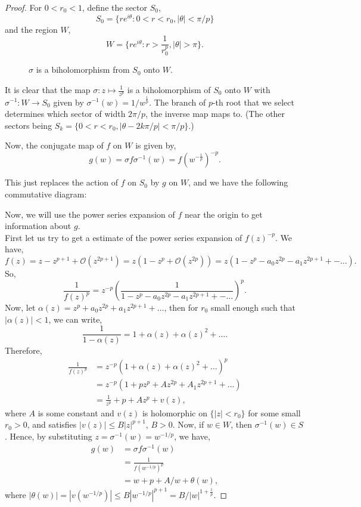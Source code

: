 \begin{proof}
	For \( 0<r_0<1 \), define the sector \( S_0 \), \[
		S_0=\{re^{i\theta}:0<r<r_0,|\theta |<\pi /p \}
	\] and the region \( W \), \[
	W=\{re^{i\theta }:r>\frac{1}{r_0^p},|\theta |>\pi\}
	.\] 

\begin{figure}[ht]
    \centering
    \caption{$\sigma$ is a biholomorphism from $S_0$ onto $W$.}
    \label{sigmamap}
\end{figure}

	It is clear that the map \( \sigma:z\mapsto \frac{1}{z^p} \) is a biholomorphism
	of \( S_0 \) onto \( W \) with \( \sigma^{-1}:W\to S_0 \) given by \( \sigma^{-1}(w)=1 /w^{\frac{1}{p}} \).
	The branch of \( p \)-th root that we select determines which sector of width \( 2\pi /p \), the inverse map
	maps to. (The other sectors being \( S_k=\{0<r<r_0,|\theta -2k\pi /p|<\pi /p \} \).)

	Now, the conjugate map of \( f \) on \( W \) is given by,\[
		g(w)=\sigma f \sigma ^{-1}(w)=f(w^{-\frac{1}{p}})^{-p}
	.\]

	This just replaces the action of \( f \) on \( S_0 \) by \( g \) on \( W \),
	and we have the following commutative diagram:

	Now, we will use the power series expansion of \( f \) near the origin to
	get information about \( g \).\\
	First let us try to get a estimate of the power series expansion of \( f(z)^{-p} \).
	We have, \[
		f(z)=z-z^{p+1}+\mathcal{O}(z^{2p+1})=z(1-z^p+\mathcal{O}(z^{2p}))=z(1-z^p-a_0z^{2p}-a_1z^{2p+1}+-\ldots)
	.\] 
	So, \[
		\frac{1}{f(z)^p}=z^{-p}\left(\frac{1}{1-z^p-a_0z^{2p}-a_1z^{2p+1}+-\ldots}\right)^p
	.\]  
	Now, let \( \alpha(z)=z^p+a_0z^{2p}+a_1z^{2p+1}+\ldots \), 
	then for \( r_0 \) small enough
	such that \( |\alpha(z)|<1 \), we can write, \[
		\frac{1}{1-\alpha(z)}=1+\alpha(z)+\alpha(z)^2+\ldots 
	.\] 
	Therefore,
	\begin{align*}
		\frac{1}{f(z)^p}&=z^{-p}(1+\alpha(z)+\alpha(z)^2+\ldots )^p\\
						&=z^{-p}(1+pz^p+Az^{2p}+A_1z^{2p+1}+\ldots )\\
						&=\frac{1}{z^p}+p+Az^p+v(z)
	,\end{align*} where \( A \) is some constant and \( v(z) \) is holomorphic
	on \( \{|z|< r_0\} \) for some small \( r_0>0 \),
	and satisfies \( |v(z)| \le B|z|^{p+1} \), \( B>0 \).
	Now, if \( w\in W \), then \( \sigma^{-1}(w)\in S \). Hence, by substituting \( z=\sigma^{-1}(w)=w^{-1/p} \), we have,
	\begin{align*}
		g(w)&=\sigma f\sigma^{-1}(w)\\
			&=\frac{1}{f(w^{-1/p})^{p}}\\
			&=w+p+A /w+\theta(w)
		,\end{align*} where \( |\theta (w)|=|v(w^{-1/p})|\le B|w^{-1/p}|^{p+1}=B /|w|^{1+\frac{1}{p}} \).


\end{proof}
